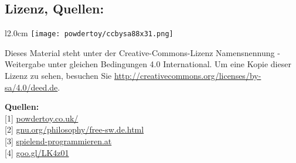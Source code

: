 \documentclass[10pt,a4paper,ngerman,twoside]{article} %
\newcommand{\SepRule}{\noindent	%
\begin{center}
\rule{250pt}{1pt} %
\end{center}
}
\begin{document}
\subsection*{Lizenz, Quellen:}
\begin{wrapfigure}{l}{2.0cm}
\texttt{[image: powdertoy/ccbysa88x31.png]}
\end{wrapfigure}
Dieses Material steht unter der Creative-Commons-Lizenz Namensnennung - Weitergabe unter gleichen Bedingungen 4.0 International. Um eine Kopie dieser Lizenz zu sehen, besuchen Sie \url{http://creativecommons.org/licenses/by-sa/4.0/deed.de}.

\textbf{Quellen:} \\
{[}1{]} \href{http://powdertoy.co.uk/}{powdertoy.co.uk/} \\
{[}2{]} \href{http://www.gnu.org/philosophy/free-sw.de.html}{gnu.org/philosophy/free-sw.de.html} \\
{[}3{]} \href{http://spielend-programmieren.at}{spielend-programmieren.at} \\
{[}4{]} \href{http://goo.gl/LK4z01}{goo.gl/LK4z01} \\

\end{document}
